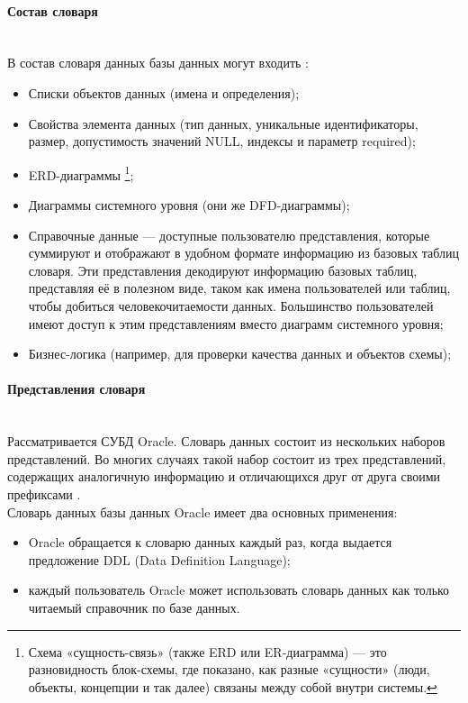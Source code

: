 \paragraph{Состав словаря} ~\\

В состав словаря данных базы данных могут входить \autocite{DataDictionary}:

\begin{itemize}
    \item Списки объектов данных (имена и определения);
    \item Свойства элемента данных (тип данных, уникальные идентификаторы, размер, допустимость значений NULL, индексы и параметр required);
    \item ERD-диаграммы 
        \footnote{Схема «сущность-связь» (также ERD или ER-диаграмма) — это разновидность блок-схемы, где показано, как разные «сущности» (люди, объекты, концепции и так далее) связаны между собой внутри системы.};
    \item Диаграммы системного уровня (они же DFD-диаграммы);
    \item Справочные данные — доступные пользователю представления, которые суммируют и отображают в удобном формате информацию из базовых таблиц словаря. Эти представления декодируют информацию базовых таблиц, представляя её в полезном виде, таком как имена пользователей или таблиц, чтобы добиться человекочитаемости данных. Большинство пользователей имеют доступ к этим представлениям вместо диаграмм системного уровня;
    \item Бизнес-логика (например, для проверки качества данных и объектов схемы);
\end{itemize}

\paragraph{Представления словаря} ~\\

Рассматривается СУБД Oracle. Словарь данных состоит из нескольких наборов представлений. Во многих случаях такой набор состоит из трех представлений, содержащих аналогичную информацию и отличающихся друг от друга своими префиксами \autocite{Kirillov2009}.\\

Словарь данных базы данных Oracle имеет два основных применения:

\begin{itemize}
    \item Oracle обращается к словарю данных каждый раз, когда выдается предложение DDL (Data Definition Language);
    \item каждый пользователь Oracle может использовать словарь данных как только читаемый справочник по базе данных.
\end{itemize}

